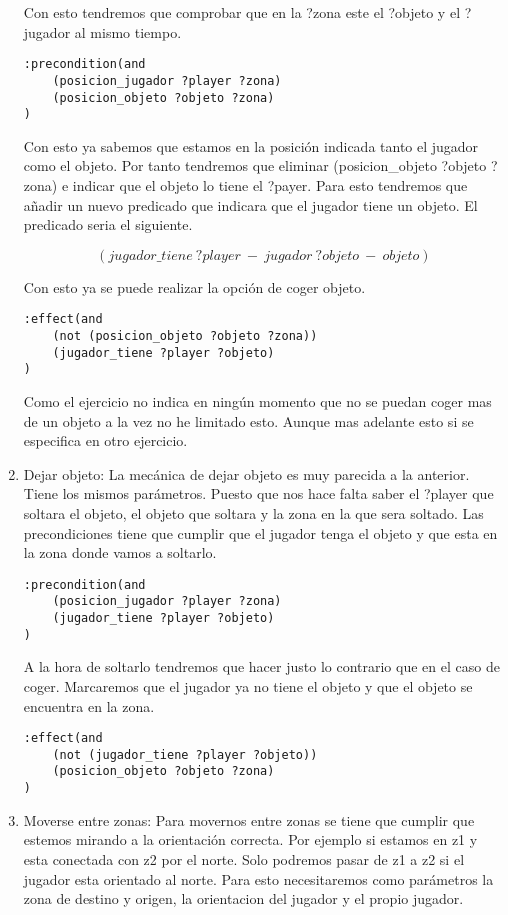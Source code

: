 \documentclass[]{article}
\begin{document}
\begin{enumerate}
Con esto tendremos que comprobar que en la ?zona este el ?objeto y el ?jugador al mismo tiempo.
\begin{lstlisting}
:precondition(and
	(posicion_jugador ?player ?zona)
	(posicion_objeto ?objeto ?zona)
)
\end{lstlisting}

Con esto ya sabemos que estamos en la posición indicada tanto el jugador como el objeto. Por tanto tendremos que eliminar (posicion\_objeto ?objeto ?zona) e indicar que el objeto lo tiene el ?payer. Para esto tendremos que añadir un nuevo predicado que indicara que el jugador tiene un objeto. El predicado seria el siguiente.

$$
(jugador\_tiene\ ?player\ -\ jugador\ ?objeto\ -\ objeto)
$$

Con esto ya se puede realizar la opción de coger objeto.
\begin{lstlisting}
:effect(and 
	(not (posicion_objeto ?objeto ?zona))
	(jugador_tiene ?player ?objeto)
)
\end{lstlisting}

Como el ejercicio no indica en ningún momento que no se puedan coger mas de un objeto a la vez no he limitado esto. Aunque mas adelante esto si se especifica en otro ejercicio.

\item{Dejar objeto:} La mecánica de dejar objeto es muy parecida a la anterior. Tiene los mismos parámetros. Puesto que nos hace falta saber el ?player que soltara el objeto, el objeto que soltara y la zona en la que sera soltado.
Las precondiciones tiene que cumplir que el jugador tenga el objeto y que esta en la zona donde vamos a soltarlo.

\begin{lstlisting}
:precondition(and
	(posicion_jugador ?player ?zona)
	(jugador_tiene ?player ?objeto)
)
\end{lstlisting}

A la hora de soltarlo tendremos que hacer justo lo contrario que en el caso de coger. Marcaremos que el jugador ya no tiene el objeto y que el objeto se encuentra en la zona.

\begin{lstlisting}
:effect(and 
	(not (jugador_tiene ?player ?objeto))
	(posicion_objeto ?objeto ?zona)
)
\end{lstlisting}

\item{Moverse entre zonas:} Para movernos entre zonas se tiene que cumplir que estemos mirando a la orientación correcta. Por ejemplo si estamos en z1 y esta conectada con z2 por el norte. Solo podremos pasar de z1 a z2 si el jugador esta orientado al norte. 
Para esto necesitaremos como parámetros la zona de destino y origen, la orientacion del jugador y el propio jugador.


\end{enumerate}
\end{document}

